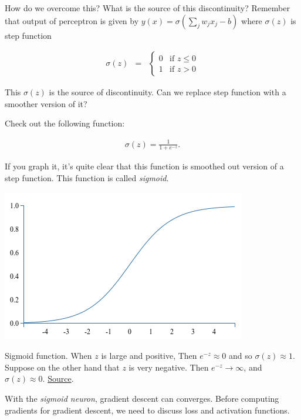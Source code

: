 \documentclass[a4paper]{tufte-handout}
\begin{document}
How do we overcome this? What is the source of this discontinuity?
Remember that output of perceptron is given by
\(y(x) = \sigma\left(\sum_j w_j x_j - b\right)\) where \(\sigma(z)\) is
step function

\begin{eqnarray*}
  \sigma(z) & = & \left\{ \begin{array}{ll}
      0 & \mbox{if } z \leq 0 \\
      1 & \mbox{if } z > 0
      \end{array} \right.
\end{eqnarray*}

This \(\sigma(z)\) is the source of discontinuity. Can we replace
step function with a smoother version of it?

Check out the following function:

\begin{eqnarray*} 
  \sigma(z) = \frac{1}{1+e^{-z}}.
\end{eqnarray*}

If you graph it, it's quite clear that this function is smoothed out
version of a step function. This function is called \emph{sigmoid}.

\begin{marginfigure}
  \includegraphics[width=\linewidth]{sigmoid}
  \caption{Sigmoid function. When \(z\) is large and
  positive, Then \(e^{-z} \approx 0\) and so \(\sigma(z) \approx 1\).
  Suppose on the other hand that \(z\) is very negative. Then
  \(e^{-z} \rightarrow \infty\), and \(\sigma(z) \approx 0\).
  \href{http://neuralnetworksanddeeplearning.com/chap1.html}{Source}.}
\end{marginfigure}

With the \emph{sigmoid neuron}, gradient descent can converges.
Before computing gradients for gradient descent, we need to discuss loss
and activation functions.
\end{document}
